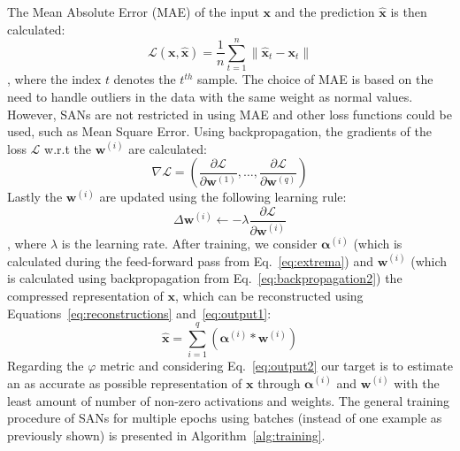 \documentclass[journal]{IEEEtran}
\begin{document}
The Mean Absolute Error (MAE) of the input $\bm{x}$ and the
prediction $\hat{\bm{x}}$ is then calculated:
\begin{equation}
  \label{eq:lossfunction}
  \mathcal{L}\left( {\bm{x},\hat{\bm{x}}} \right) =
  \frac{1}{n}\sum\limits_{t=1}^n \Big\lVert\hat{\bm{x}}_t - \bm{x}_t \Big\rVert
\end{equation}
\noindent
, where the index $t$ denotes the $t^{th}$ sample.
The choice of MAE is based on the need to handle outliers in the data
with the same weight as normal values.
However, SANs are not restricted in using MAE and other loss
functions could be used, such as Mean Square Error.
Using backpropagation, the gradients of the loss $\mathcal{L}$ w.r.t
the $\bm{w}^{(i)}$ are calculated:
\begin{equation}
  \label{eq:backpropagation1}
  \nabla\mathcal{L} = \left(
  \frac{\partial\mathcal{L}}{\partial\bm{w}^{(1)}},\ldots,\frac{\partial\mathcal{L}}{\partial\bm{w}^{(q)}}\right)
\end{equation}
Lastly the $\bm{w}^{(i)}$ are updated using the following learning rule:
\begin{equation}
  \label{eq:backpropagation2}
  \Delta\bm{w}^{(i)} \leftarrow
  -\lambda\frac{\partial\mathcal{L}}{\partial\bm{w}^{(i)}}
\end{equation}
\noindent
, where $\lambda$ is the learning rate.
After training, we consider $\bm{\alpha}^{(i)}$ (which is calculated
during the feed-forward pass from Eq.~\ref{eq:extrema}) and
$\bm{w}^{(i)}$ (which is calculated using backpropagation from
Eq.~\ref{eq:backpropagation2}) the compressed representation of
$\bm{x}$, which can be reconstructed using
Equations~\ref{eq:reconstructions} and~\ref{eq:output1}:
\begin{equation}
  \label{eq:output2}
  \hat{\bm{x}} = \sum\limits_{i=1}^q \left(\bm{\alpha}^{(i)} *
  \bm{w}^{(i)}\right)
\end{equation}
Regarding the $\varphi$ metric and considering Eq.~\ref{eq:output2}
our target is to estimate an as accurate as possible representation
of $\bm{x}$ through $\bm{\alpha}^{(i)}$ and $\bm{w}^{(i)}$ with the
least amount of number of non-zero activations and weights.
The general training procedure of SANs for multiple epochs using
batches (instead of one example as previously shown) is presented in
Algorithm~\ref{alg:training}.
\end{document}
